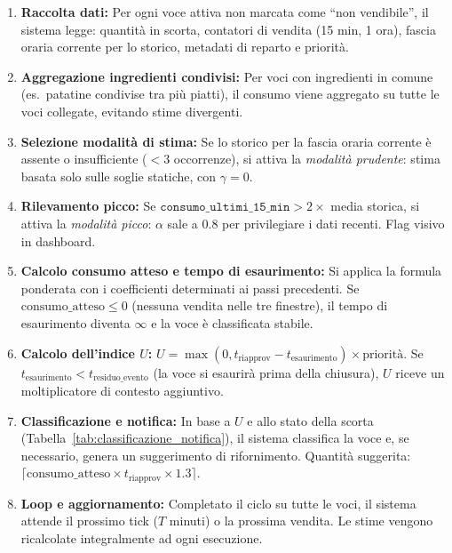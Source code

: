 \begin{enumerate}
    \item[\textbf{Passo 1}] \textbf{Raccolta dati:} Per ogni voce attiva non marcata come ``non vendibile'', il sistema legge: quantità in scorta, contatori di vendita (15 min, 1 ora), fascia oraria corrente per lo storico, metadati di reparto e priorità.

    \item[\textbf{Passo 2}] \textbf{Aggregazione ingredienti condivisi:} Per voci con ingredienti in comune (es.\ patatine condivise tra più piatti), il consumo viene aggregato su tutte le voci collegate, evitando stime divergenti.

    \item[\textbf{Passo 3}] \textbf{Selezione modalità di stima:} Se lo storico per la fascia oraria corrente è assente o insufficiente ($<3$ occorrenze), si attiva la \emph{modalità prudente}: stima basata solo sulle soglie statiche, con $\gamma = 0$.

    \item[\textbf{Passo 4}] \textbf{Rilevamento picco:} Se $\texttt{consumo\_ultimi\_15\_min} > 2\times$ media storica, si attiva la \emph{modalità picco}: $\alpha$ sale a $0.8$ per privilegiare i dati recenti. Flag visivo in dashboard.

    \item[\textbf{Passo 5}] \textbf{Calcolo consumo atteso e tempo di esaurimento:} Si applica la formula ponderata con i coefficienti determinati ai passi precedenti. Se $\text{consumo\_atteso} \le 0$ (nessuna vendita nelle tre finestre), il tempo di esaurimento diventa $\infty$ e la voce è classificata stabile.

    \item[\textbf{Passo 6}] \textbf{Calcolo dell'indice $U$:} $U = \max(0, t_{\text{riapprov}} - t_{\text{esaurimento}}) \times \text{priorità}$. Se $t_{\text{esaurimento}} < t_{\text{residuo\_evento}}$ (la voce si esaurirà prima della chiusura), $U$ riceve un moltiplicatore di contesto aggiuntivo.

    \item[\textbf{Passo 7}] \textbf{Classificazione e notifica:} In base a $U$ e allo stato della scorta (Tabella~\ref{tab:classificazione_notifica}), il sistema classifica la voce e, se necessario, genera un suggerimento di rifornimento. Quantità suggerita: $\lceil \text{consumo\_atteso} \times t_{\text{riapprov}} \times 1.3 \rceil$.

    \item[\textbf{Passo 8}] \textbf{Loop e aggiornamento:} Completato il ciclo su tutte le voci, il sistema attende il prossimo tick ($T$ minuti) o la prossima vendita. Le stime vengono ricalcolate integralmente ad ogni esecuzione.
\end{enumerate}

